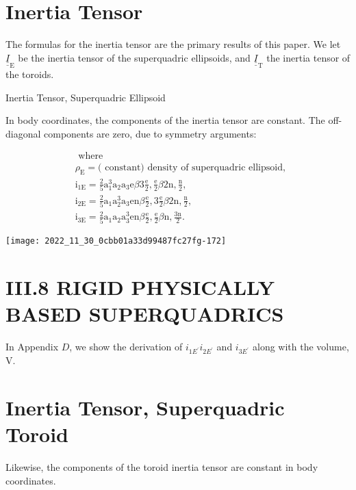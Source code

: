\section{Inertia Tensor}
The formulas for the inertia tensor are the primary results of this paper. We let $\underline{\underline{I}}_{\mathrm{E}}$ be the inertia tensor of the superquadric ellipsoids, and $\underline{\underline{I}}_{\mathrm{T}}$ the inertia tensor of the toroids.

Inertia Tensor, Superquadric Ellipsoid

In body coordinates, the components of the inertia tensor are constant. The off-diagonal components are zero, due to symmetry arguments:

$$
\begin{aligned}
& \text { where } \\
& \rho_{\mathrm{E}}=(\text { constant) density of superquadric ellipsoid, } \\
& \mathrm{i}_{1 \mathrm{E}}=\frac{2}{5} \mathrm{a}_{1}^{3} \mathrm{a}_{2} \mathrm{a}_{3} \mathrm{e} \beta 3 \frac{\mathrm{e}}{2}, \frac{\mathrm{e}}{2} \beta 2 \mathrm{n}, \frac{\mathrm{n}}{2} \text {, } \\
& \mathrm{i}_{2 \mathrm{E}}=\frac{2}{5} \mathrm{a}_{1} \mathrm{a}_{2}^{3} \mathrm{a}_{3} \mathrm{e} \mathrm{n} \beta \frac{\mathrm{e}}{2}, 3 \frac{\mathrm{e}}{2} \beta 2 \mathrm{n}, \frac{\mathrm{n}}{2} \text {, } \\
& \mathrm{i}_{3 \mathrm{E}}=\frac{2}{5} \mathrm{a}_{1} \mathrm{a}_{2} \mathrm{a}_{3}^{3} \mathrm{e} \mathrm{n} \beta \frac{\mathrm{e}}{2}, \frac{\mathrm{e}}{2} \beta \mathrm{n}, \frac{3 \mathrm{n}}{2} \text {. }
\end{aligned}
$$

\begin{center}
\texttt{[image: 2022\_11\_30\_0cbb01a33d99487fc27fg-172]}
\end{center}

\section{III.8 RIGID PHYSICALLY BASED SUPERQUADRICS}
In Appendix $D$, we show the derivation of $i_{1 E^{\prime}} i_{2 E^{\prime}}$ and $i_{3 E^{\prime}}$ along with the volume, V.

\section{Inertia Tensor, Superquadric Toroid}
Likewise, the components of the toroid inertia tensor are constant in body coordinates.

